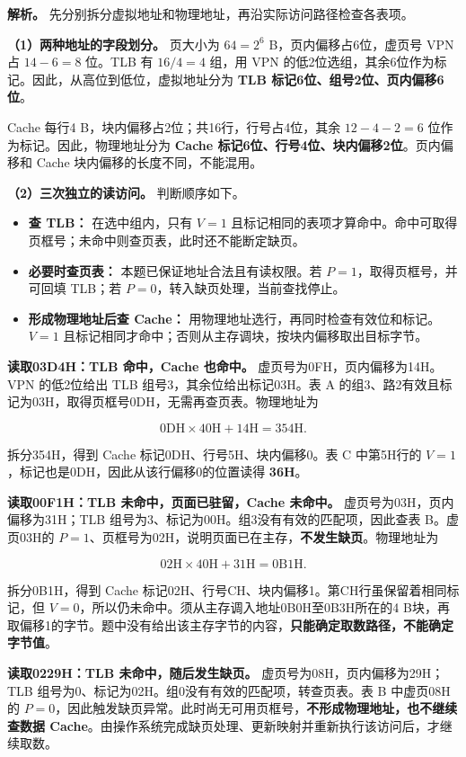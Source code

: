 \textbf{解析。} 先分别拆分虚拟地址和物理地址，再沿实际访问路径检查各表项。

\textbf{（1）两种地址的字段划分。} 页大小为 \(64=2^6\) B，页内偏移占6位，虚页号 VPN 占 \(14-6=8\) 位。TLB 有 \(16/4=4\) 组，用 VPN 的低2位选组，其余6位作为标记。因此，从高位到低位，虚拟地址分为 \textbf{TLB 标记6位、组号2位、页内偏移6位}。

Cache 每行4 B，块内偏移占2位；共16行，行号占4位，其余 \(12-4-2=6\) 位作为标记。因此，物理地址分为 \textbf{Cache 标记6位、行号4位、块内偏移2位}。页内偏移和 Cache 块内偏移的长度不同，不能混用。

\textbf{（2）三次独立的读访问。} 判断顺序如下。

\begin{itemize}
\tightlist
\item
  \textbf{查 TLB：} 在选中组内，只有 \(V=1\) 且标记相同的表项才算命中。命中可取得页框号；未命中则查页表，此时还不能断定缺页。
\item
  \textbf{必要时查页表：} 本题已保证地址合法且有读权限。若 \(P=1\)，取得页框号，并可回填 TLB；若 \(P=0\)，转入缺页处理，当前查找停止。
\item
  \textbf{形成物理地址后查 Cache：} 用物理地址选行，再同时检查有效位和标记。\(V=1\) 且标记相同才命中；否则从主存调块，按块内偏移取出目标字节。
\end{itemize}

\textbf{读取03D4H：TLB 命中，Cache 也命中。} 虚页号为0FH，页内偏移为14H。VPN 的低2位给出 TLB 组号3，其余位给出标记03H。表 A 的组3、路2有效且标记为03H，取得页框号0DH，无需再查页表。物理地址为

\[
\mathrm{0DH}\times\mathrm{40H}+\mathrm{14H}=\mathrm{354H}.
\]

拆分354H，得到 Cache 标记0DH、行号5H、块内偏移0。表 C 中第5H行的 \(V=1\)，标记也是0DH，因此从该行偏移0的位置读得 \textbf{36H}。

\textbf{读取00F1H：TLB 未命中，页面已驻留，Cache 未命中。} 虚页号为03H，页内偏移为31H；TLB 组号为3、标记为00H。组3没有有效的匹配项，因此查表 B。虚页03H的 \(P=1\)、页框号为02H，说明页面已在主存，\textbf{不发生缺页}。物理地址为

\[
\mathrm{02H}\times\mathrm{40H}+\mathrm{31H}=\mathrm{0B1H}.
\]

拆分0B1H，得到 Cache 标记02H、行号CH、块内偏移1。第CH行虽保留着相同标记，但 \(V=0\)，所以仍未命中。须从主存调入地址0B0H至0B3H所在的4 B块，再取偏移1的字节。题中没有给出该主存字节的内容，\textbf{只能确定取数路径，不能确定字节值}。

\textbf{读取0229H：TLB 未命中，随后发生缺页。} 虚页号为08H，页内偏移为29H；TLB 组号为0、标记为02H。组0没有有效的匹配项，转查页表。表 B 中虚页08H的 \(P=0\)，因此触发缺页异常。此时尚无可用页框号，\textbf{不形成物理地址，也不继续查数据 Cache}。由操作系统完成缺页处理、更新映射并重新执行该访问后，才继续取数。

